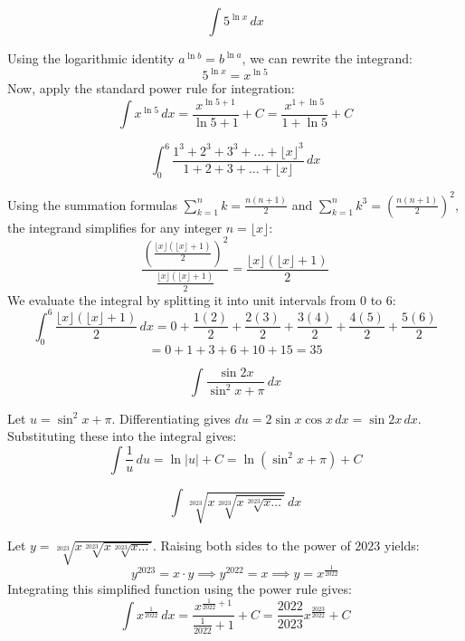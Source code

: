 \begin{questions}
    \question \[ \int 5^{\ln x} \,dx \]
    \begin{solution}
        Using the logarithmic identity $a^{\ln b} = b^{\ln a}$, we can rewrite the integrand:
        \[ 5^{\ln x} = x^{\ln 5} \]
        Now, apply the standard power rule for integration:
        \[ \int x^{\ln 5} \,dx = \frac{x^{\ln 5 + 1}}{\ln 5 + 1} + C = \frac{x^{1+\ln 5}}{1+\ln 5} + C \]
    \end{solution}

    \question \[ \int_{0}^{6} \frac{1^3+2^3+3^3+\dots+\lfloor x \rfloor^3}{1+2+3+\dots+\lfloor x \rfloor} \,dx \]
    \begin{solution}
        Using the summation formulas $\sum_{k=1}^{n} k = \frac{n(n+1)}{2}$ and $\sum_{k=1}^{n} k^3 = \left(\frac{n(n+1)}{2}\right)^2$, the integrand simplifies for any integer $n = \lfloor x \rfloor$:
        \[ \frac{\left(\frac{\lfloor x \rfloor(\lfloor x \rfloor+1)}{2}\right)^2}{\frac{\lfloor x \rfloor(\lfloor x \rfloor+1)}{2}} = \frac{\lfloor x \rfloor(\lfloor x \rfloor+1)}{2} \]
        We evaluate the integral by splitting it into unit intervals from $0$ to $6$:
        \[ \int_{0}^{6} \frac{\lfloor x \rfloor(\lfloor x \rfloor+1)}{2} \,dx = 0 + \frac{1(2)}{2} + \frac{2(3)}{2} + \frac{3(4)}{2} + \frac{4(5)}{2} + \frac{5(6)}{2} \]
        \[ = 0 + 1 + 3 + 6 + 10 + 15 = 35 \]
    \end{solution}

    \question \[ \int \frac{\sin 2x}{\sin^2 x + \pi} \,dx \]
    \begin{solution}
        Let $u = \sin^2 x + \pi$. Differentiating gives $du = 2\sin x \cos x \,dx = \sin 2x \,dx$. Substituting these into the integral gives:
        \[ \int \frac{1}{u} \,du = \ln|u| + C = \ln(\sin^2 x + \pi) + C \]
    \end{solution}

    \question \[ \int \sqrt[2023]{x\sqrt[2023]{x\sqrt[2023]{x\dots}}} \,dx \]
    \begin{solution}
        Let $y = \sqrt[2023]{x\sqrt[2023]{x\sqrt[2023]{x\dots}}}$. Raising both sides to the power of $2023$ yields:
        \[ y^{2023} = x \cdot y \implies y^{2022} = x \implies y = x^{\frac{1}{2022}} \]
        Integrating this simplified function using the power rule gives:
        \[ \int x^{\frac{1}{2022}} \,dx = \frac{x^{\frac{1}{2022}+1}}{\frac{1}{2022}+1} + C = \frac{2022}{2023}x^{\frac{2023}{2022}} + C \]
    \end{solution}


\end{questions}
